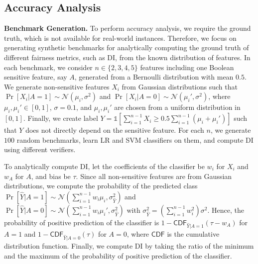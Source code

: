 \subsection{Accuracy Analysis}
\noindent\textbf{Benchmark Generation.} To perform accuracy analysis, we require the ground truth, which is not available for real-world instances. Therefore, we focus on generating synthetic benchmarks for analytically computing the ground truth of different fairness metrics, such as DI, from the known distribution of features. In each benchmark, we consider $ n \in \{2, 3, 4, 5\} $ features including one Boolean sensitive feature, say $ A $, generated from a Bernoulli distribution with mean $ 0.5 $.  We generate non-sensitive features $ X_i $ from Gaussian distributions such that   $ \Pr[X_i | A = 1] \sim \mathcal{N}(\mu_i, \sigma^2) $ and $ \Pr[X_i | A = 0] \sim \mathcal{N}(\mu_i', \sigma^2) $, where $ \mu_i, \mu_i' \in [0,1] $, $ \sigma = 0.1 $, and $ \mu_i, \mu_i' $ are chosen from a uniform distribution in $ [0,1] $. Finally, we create label $ Y = \mathds{1}[ \sum_{i=1}^{n-1} X_i \ge 0.5 \sum_{i=1}^{n-1} (\mu_i + \mu_i')] $ such that $ Y $ does not directly depend on the sensitive feature. For each $ n $, we generate $ 100 $ random benchmarks, learn LR and SVM classifiers on them, and compute DI using different verifiers.

  
To analytically compute DI, let the coefficients of the classifier be $ w_i $ for $ X_i $ and $ w_A $ for $ A $, and bias be $ \tau $. Since all non-sensitive features are from Gaussian distributions, we compute the probability of the predicted class $ \Pr[\hat{Y} | A = 1]  \sim \mathcal{N}(\sum_{i=1}^{n-1}w_i\mu_i, \sigma_{\hat{Y}}^2) $ and $ \Pr[\hat{Y} | A = 0]  \sim \mathcal{N}(\sum_{i=1}^{n-1}w_i\mu_i', \sigma_{\hat{Y}}^2) $ with $ \sigma_{\hat{Y}}^2 =   (\sum_{i=1}^{n-1}w_i^2)\sigma^2 $. Hence, the probability of positive prediction of the classifier  is $  1 - \mathsf{CDF}_{\hat{Y}| A =1}(\tau - w_A) $ for $ A = 1 $ and $  1 - \mathsf{CDF}_{\hat{Y}|A=0}(\tau) $ for $ A = 0 $, where $ \mathsf{CDF} $ is the cumulative distribution function. Finally, we compute DI by taking the ratio of the minimum and the maximum of the probability of positive prediction of the classifier.



